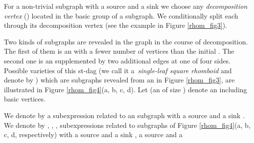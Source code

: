 \documentclass[11pt]{article}\usepackage{amsmath}
\begin{document}
For a non-trivial  subgraph with a source  and a sink  we choose any
\textit{decomposition vertex}  () located in the basic group of a
subgraph. We conditionally split each  through its decomposition vertex
(see the example in Figure \ref{rhom_fig3}).\pagebreak

Two kinds of subgraphs are revealed in the graph in the course of
decomposition. The first of them is an  with a fewer number of vertices
than the initial . The second one is an  supplemented by two
additional edges at one of four sides. Possible varieties of this st-dag (we
call it a\textit{\ single-leaf square rhomboid} and denote by )
which are subgraphs revealed from an  in Figure \ref{rhom_fig3}, are
illustrated in Figure \ref{rhom_fig4}(a, b, c, d). Let  (an
 of size ) denote an  including  basic vertices.

We denote by  a subexpression related to an  subgraph with a
source  and a sink . We denote by , , ,  subexpressions related to
 subgraphs of Figure \ref{rhom_fig4}(a, b, c, d, respectively)
with a source  and a sink , a source  and a
\end{document}
